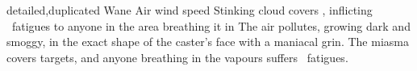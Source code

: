   {detailed,duplicated}%
  {Wane}%
  {Air}%
  {wind speed}%
  {Stinking cloud covers , inflicting ~\glspl{fatigue} to anyone in the area breathing it in}%
  {
    The air pollutes, growing dark and smoggy, in the exact shape of the caster's face with a maniacal grin.
    The miasma covers  targets, and anyone breathing in the vapours suffers ~\glspl{fatigue}.
  }


